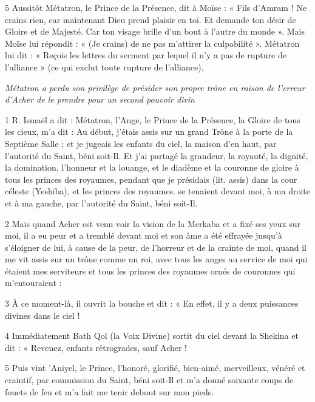 \par 5 Aussitôt Métatron, le Prince de la Présence, dit à Moïse : « Fils d'Amram ! Ne crains rien, car maintenant Dieu prend plaisir en toi. Et demande ton désir de Gloire et de Majesté. Car ton visage brille d’un bout à l’autre du monde ». Mais Moïse lui répondit : « (Je crains) de ne pas m'attirer la culpabilité ». Métatron lui dit : « Reçois les lettres du serment par lequel il n'y a pas de rupture de l'alliance » (ce qui exclut toute rupture de l'alliance),


\par \textit{Métatron a perdu son privilège de présider son propre trône en raison de l'erreur d'Acher de le prendre pour un second pouvoir divin}

\par 1 R. Ismaël a dit : Métatron, l'Ange, le Prince de la Présence, la Gloire de tous les cieux, m'a dit : Au début, j'étais assis sur un grand Trône à la porte de la Septième Salle ; et je jugeais les enfants du ciel, la maison d'en haut, par l'autorité du Saint, béni soit-Il. Et j'ai partagé la grandeur, la royauté, la dignité, la domination, l'honneur et la louange, et le diadème et la couronne de gloire à tous les princes des royaumes, pendant que je présidais (lit. assis) dans la cour céleste (Yeshiba), et les princes des royaumes. se tenaient devant moi, à ma droite et à ma gauche, par l'autorité du Saint, béni soit-Il.

\par 2 Mais quand Acher est venu voir la vision de la Merkaba et a fixé ses yeux sur moi, il a eu peur et a tremblé devant moi et son âme a été effrayée jusqu'à s'éloigner de lui, à cause de la peur, de l'horreur et de la crainte de moi, quand il me vit assis sur un trône comme un roi, avec tous les anges au service de moi qui étaient mes serviteurs et tous les princes des royaumes ornés de couronnes qui m'entouraient :

\par 3 À ce moment-là, il ouvrit la bouche et dit : « En effet, il y a deux puissances divines dans le ciel !

\par 4 Immédiatement Bath Qol (la Voix Divine) sortit du ciel devant la Shekina et dit : « Revenez, enfants rétrogrades, sauf Acher !

\par 5 Puis vint 'Aniyel, le Prince, l'honoré, glorifié, bien-aimé, merveilleux, vénéré et craintif, par commission du Saint, béni soit-Il et m'a donné soixante coups de fouets de feu et m'a fait me tenir debout sur mon pieds.

